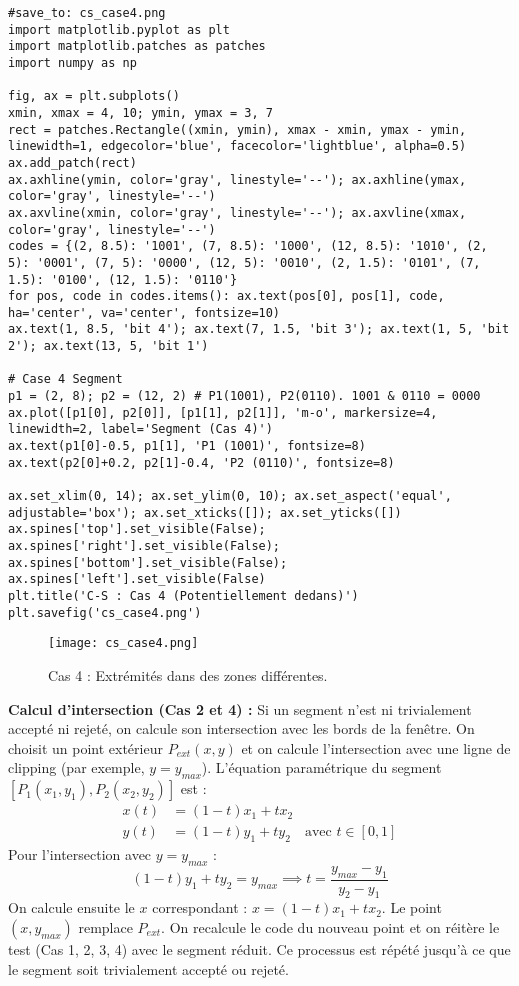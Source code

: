 \documentclass{article}
\begin{document}
\begin{verbatim}
#save_to: cs_case4.png
import matplotlib.pyplot as plt
import matplotlib.patches as patches
import numpy as np

fig, ax = plt.subplots()
xmin, xmax = 4, 10; ymin, ymax = 3, 7
rect = patches.Rectangle((xmin, ymin), xmax - xmin, ymax - ymin, linewidth=1, edgecolor='blue', facecolor='lightblue', alpha=0.5)
ax.add_patch(rect)
ax.axhline(ymin, color='gray', linestyle='--'); ax.axhline(ymax, color='gray', linestyle='--')
ax.axvline(xmin, color='gray', linestyle='--'); ax.axvline(xmax, color='gray', linestyle='--')
codes = {(2, 8.5): '1001', (7, 8.5): '1000', (12, 8.5): '1010', (2, 5): '0001', (7, 5): '0000', (12, 5): '0010', (2, 1.5): '0101', (7, 1.5): '0100', (12, 1.5): '0110'}
for pos, code in codes.items(): ax.text(pos[0], pos[1], code, ha='center', va='center', fontsize=10)
ax.text(1, 8.5, 'bit 4'); ax.text(7, 1.5, 'bit 3'); ax.text(1, 5, 'bit 2'); ax.text(13, 5, 'bit 1')

# Case 4 Segment
p1 = (2, 8); p2 = (12, 2) # P1(1001), P2(0110). 1001 & 0110 = 0000
ax.plot([p1[0], p2[0]], [p1[1], p2[1]], 'm-o', markersize=4, linewidth=2, label='Segment (Cas 4)')
ax.text(p1[0]-0.5, p1[1], 'P1 (1001)', fontsize=8)
ax.text(p2[0]+0.2, p2[1]-0.4, 'P2 (0110)', fontsize=8)

ax.set_xlim(0, 14); ax.set_ylim(0, 10); ax.set_aspect('equal', adjustable='box'); ax.set_xticks([]); ax.set_yticks([])
ax.spines['top'].set_visible(False); ax.spines['right'].set_visible(False); ax.spines['bottom'].set_visible(False); ax.spines['left'].set_visible(False)
plt.title('C-S : Cas 4 (Potentiellement dedans)')
plt.savefig('cs_case4.png')
\end{verbatim}
\begin{figure}[H] \centering \texttt{[image: cs\_case4.png]} \caption{Cas 4 : Extrémités dans des zones différentes.} \label{fig:cs_case4} \end{figure}

\textbf{Calcul d'intersection (Cas 2 et 4) :}
Si un segment n'est ni trivialement accepté ni rejeté, on calcule son intersection avec les bords de la fenêtre. On choisit un point extérieur $P_{ext}(x, y)$ et on calcule l'intersection avec une ligne de clipping (par exemple, $y = y_{max}$). L'équation paramétrique du segment $[P_1(x_1, y_1), P_2(x_2, y_2)]$ est :
\begin{align*} x(t) &= (1-t)x_1 + tx_2 \\ y(t) &= (1-t)y_1 + ty_2 \quad \text{avec } t \in [0, 1] \end{align*}
Pour l'intersection avec $y = y_{max}$ :
\[ (1-t)y_1 + ty_2 = y_{max} \implies t = \frac{y_{max} - y_1}{y_2 - y_1} \]
On calcule ensuite le $x$ correspondant : $x = (1-t)x_1 + tx_2$. Le point $(x, y_{max})$ remplace $P_{ext}$. On recalcule le code du nouveau point et on réitère le test (Cas 1, 2, 3, 4) avec le segment réduit. Ce processus est répété jusqu'à ce que le segment soit trivialement accepté ou rejeté.
\end{document}
